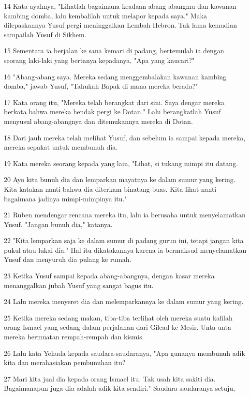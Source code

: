 \par 14 Kata ayahnya, "Lihatlah bagaimana keadaan abang-abangmu dan kawanan kambing domba, lalu kembalilah untuk melapor kepada saya." Maka dilepaskannya Yusuf pergi meninggalkan Lembah Hebron. Tak lama kemudian sampailah Yusuf di Sikhem.
\par 15 Sementara ia berjalan ke sana kemari di padang, bertemulah ia dengan seorang laki-laki yang bertanya kepadanya, "Apa yang kaucari?"
\par 16 "Abang-abang saya. Mereka sedang menggembalakan kawanan kambing domba," jawab Yusuf, "Tahukah Bapak di mana mereka berada?"
\par 17 Kata orang itu, "Mereka telah berangkat dari sini. Saya dengar mereka berkata bahwa mereka hendak pergi ke Dotan." Lalu berangkatlah Yusuf menyusul abang-abangnya dan ditemukannya mereka di Dotan.
\par 18 Dari jauh mereka telah melihat Yusuf, dan sebelum ia sampai kepada mereka, mereka sepakat untuk membunuh dia.
\par 19 Kata mereka seorang kepada yang lain, "Lihat, si tukang mimpi itu datang.
\par 20 Ayo kita bunuh dia dan lemparkan mayatnya ke dalam sumur yang kering. Kita katakan nanti bahwa dia diterkam binatang buas. Kita lihat nanti bagaimana jadinya mimpi-mimpinya itu."
\par 21 Ruben mendengar rencana mereka itu, lalu ia berusaha untuk menyelamatkan Yusuf. "Jangan bunuh dia," katanya.
\par 22 "Kita lemparkan saja ke dalam sumur di padang gurun ini, tetapi jangan kita pukul atau lukai dia." Hal itu dikatakannya karena ia bermaksud menyelamatkan Yusuf dan menyuruh dia pulang ke rumah.
\par 23 Ketika Yusuf sampai kepada abang-abangnya, dengan kasar mereka menanggalkan jubah Yusuf yang sangat bagus itu.
\par 24 Lalu mereka menyeret dia dan melemparkannya ke dalam sumur yang kering.
\par 25 Ketika mereka sedang makan, tiba-tiba terlihat oleh mereka suatu kafilah orang Ismael yang sedang dalam perjalanan dari Gilead ke Mesir. Unta-unta mereka bermuatan rempah-rempah dan kismis.
\par 26 Lalu kata Yehuda kepada saudara-saudaranya, "Apa gunanya membunuh adik kita dan merahasiakan pembunuhan itu?
\par 27 Mari kita jual dia kepada orang Ismael itu. Tak usah kita sakiti dia. Bagaimanapun juga dia adalah adik kita sendiri." Saudara-saudaranya setuju,
